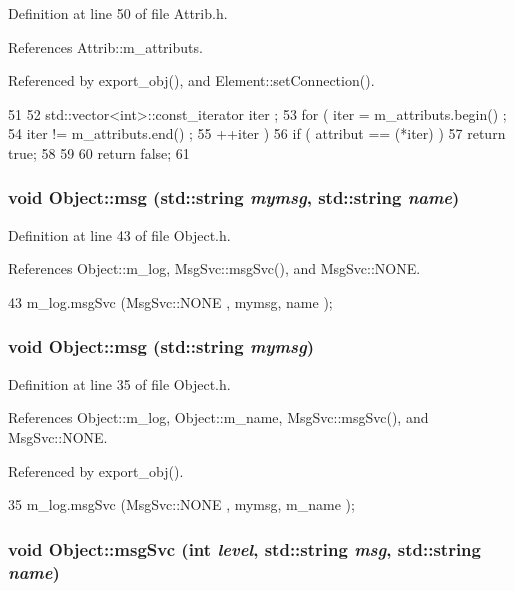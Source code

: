 Definition at line 50 of file Attrib.h.

References Attrib::m\_\-attributs.

Referenced by export\_\-obj(), and Element::setConnection().


\begin{DoxyCode}
51   {
52     std::vector<int>::const_iterator iter ;
53     for ( iter  = m_attributs.begin() ;
54           iter != m_attributs.end()   ;
55           ++iter ) {
56       if ( attribut == (*iter) ) {
57         return true;
58       }
59     }
60     return false;
61   }
\end{DoxyCode}
\hypertarget{classObject_ac5d59299273cee27aacf7de00d2e7034}{
\subsubsection[{msg}]{\setlength{\rightskip}{0pt plus 5cm}void Object::msg (std::string {\em mymsg}, \/  std::string {\em name})}}
\label{classObject_ac5d59299273cee27aacf7de00d2e7034}


Definition at line 43 of file Object.h.

References Object::m\_\-log, MsgSvc::msgSvc(), and MsgSvc::NONE.


\begin{DoxyCode}
43 { m_log.msgSvc (MsgSvc::NONE    , mymsg, name ); }
\end{DoxyCode}
\hypertarget{classObject_a58b2d0618c2d08cf2383012611528d97}{
\subsubsection[{msg}]{\setlength{\rightskip}{0pt plus 5cm}void Object::msg (std::string {\em mymsg})}}
\label{classObject_a58b2d0618c2d08cf2383012611528d97}


Definition at line 35 of file Object.h.

References Object::m\_\-log, Object::m\_\-name, MsgSvc::msgSvc(), and MsgSvc::NONE.

Referenced by export\_\-obj().


\begin{DoxyCode}
35 { m_log.msgSvc (MsgSvc::NONE    , mymsg, m_name ); }
\end{DoxyCode}
\hypertarget{classObject_a3f9d5537ebce0c0f2bf6ae4d92426f3c}{
\subsubsection[{msgSvc}]{\setlength{\rightskip}{0pt plus 5cm}void Object::msgSvc (int {\em level}, \/  std::string {\em msg}, \/  std::string {\em name})}}
\label{classObject_a3f9d5537ebce0c0f2bf6ae4d92426f3c}


